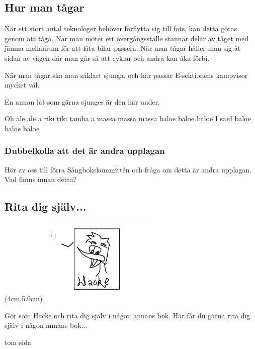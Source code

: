 \subsection*{Hur man tågar}

När ett stort antal teknologer behöver förflytta sig till fots, kan detta göras genom att tåga. 
När man möter ett övergångsställe stannar delar av tåget med jämna mellanrum för att låta bilar passera.
När man tågar håller man sig åt sidan av vägen där man går så att cyklar och andra kan åka förbi.

När man tågar ska man såklart sjunga, och här passar E-sektionens kampvisor mycket väl.

En annan låt som gärna sjunges är den här under. 

Oh ale ale
a riki tiki tamba
a massa massa massa
baloe baloe baloe
I said baloe baloe baloe


\subsubsection*{Dubbelkolla att det är andra upplagan}
Hör av oss till förra Sångbokskommittén och fråga om detta är andra upplagan. Vad fanns innan detta?


\newpage
\subsection*{Rita dig själv...}

\begin{textblock*}{6cm}(4cm,5.0cm) %
  \includegraphics[width=5.5cm]{./bilder/Untitled.png} %
\end{textblock*}

Gör som Hacke och rita dig själv i någon annans bok.
Här får du gärna rita dig själv i någon annans bok...




\newpage

tom sida

\newpage